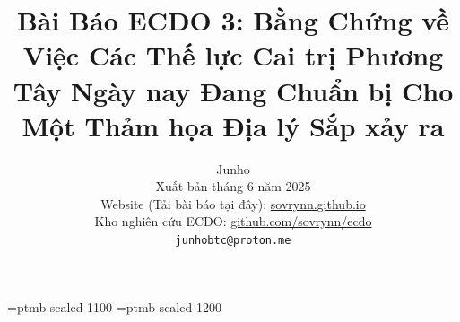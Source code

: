 \makeatletter
\def\abstract{%
  \centerline{\large\bf Tóm tắt}%
  \vspace*{12pt}%
  \it%
}
\makeatother

\makeatletter
\def\cvprsubsection{%
  \@startsection{subsection}{2}{\z@}%
    {8pt plus 2pt minus 2pt}{6pt}%
    {\normalfont\bfseries\fontsize{11}{13}\selectfont}%
}
\makeatother

\font\elvbf=ptmb scaled 1100
\font\elvbfs=ptmb scaled 1200
\makeatletter
\renewcommand\thesection{%
  {\elvbfs\arabic{section}}%
}

\renewcommand\thesubsection{%
  {\elvbf
   \arabic{section}.\arabic{subsection}}%
}
\makeatother

\setcounter{page}{1}



\title{Bài Báo ECDO 3: Bằng Chứng về Việc Các Thế lực Cai trị Phương Tây Ngày nay Đang Chuẩn bị Cho Một Thảm họa Địa lý Sắp xảy ra}

\author{Junho\\
Xuất bản tháng 6 năm 2025\\
Website (Tải bài báo tại đây): \href{https://sovrynn.github.io}{sovrynn.github.io}\\
Kho nghiên cứu ECDO: \href{https://github.com/sovrynn/ecdo}{github.com/sovrynn/ecdo}\\
{\tt\small junhobtc@proton.me}
}

\maketitle

